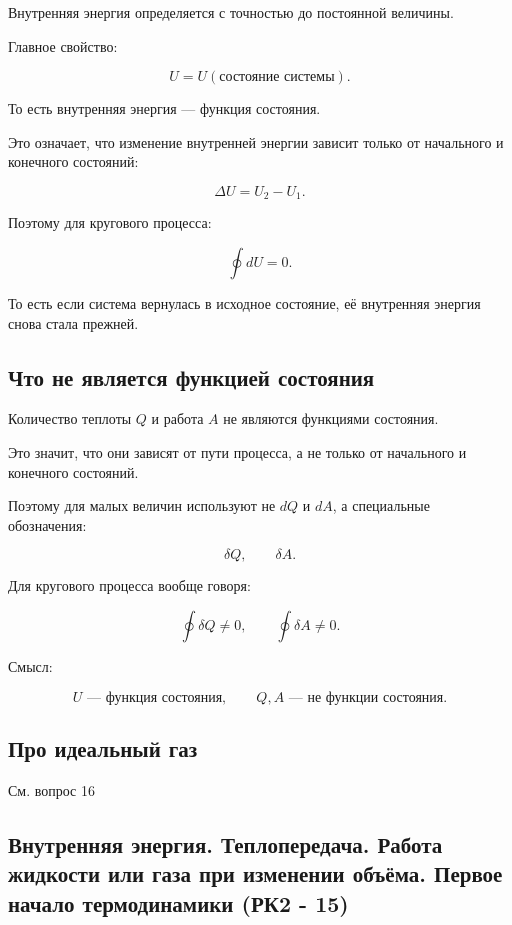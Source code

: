 \documentclass[a4paper,12pt]{article}
\begin{document}
Внутренняя энергия определяется с точностью до постоянной величины.

Главное свойство:

\[
U=U(\text{состояние системы}).
\]

То есть внутренняя энергия — функция состояния.

Это означает, что изменение внутренней энергии зависит только от начального и конечного состояний:

\[
\Delta U = U_2 - U_1.
\]

Поэтому для кругового процесса:

\[
\oint dU=0.
\]

То есть если система вернулась в исходное состояние, её внутренняя энергия снова стала прежней.

\subsection*{Что не является функцией состояния}

Количество теплоты $Q$ и работа $A$ не являются функциями состояния.

Это значит, что они зависят от пути процесса, а не только от начального и конечного состояний.

Поэтому для малых величин используют не $dQ$ и $dA$, а специальные обозначения:

\[
\delta Q,
\qquad
\delta A.
\]

Для кругового процесса вообще говоря:

\[
\oint \delta Q \neq 0,
\qquad
\oint \delta A \neq 0.
\]

Смысл:

\[
U \text{ — функция состояния},
\qquad
Q,A \text{ — не функции состояния}.
\]

\subsection*{Про идеальный газ}

См. вопрос 16

\subsection{Внутренняя энергия. Теплопередача. Работа жидкости или газа при изменении объёма. Первое начало термодинамики (РК2 - 15)}
\end{document}
